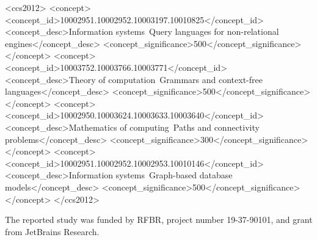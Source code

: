 \documentclass[sigconf,edbt,table]{acmart-edbt2021}
\begin{document}
%
\begin{CCSXML}
		<ccs2012>
		<concept>
			<concept_id>10002951.10002952.10003197.10010825</concept_id>
			<concept_desc>Information systems~Query languages for non-relational engines</concept_desc>
			<concept_significance>500</concept_significance>
		</concept>
		<concept>
			<concept_id>10003752.10003766.10003771</concept_id>
			<concept_desc>Theory of computation~Grammars and context-free languages</concept_desc>
			<concept_significance>500</concept_significance>
		</concept>
		<concept>
			<concept_id>10002950.10003624.10003633.10003640</concept_id>
			<concept_desc>Mathematics of computing~Paths and connectivity problems</concept_desc>
			<concept_significance>300</concept_significance>
		</concept>
		<concept>
			<concept_id>10002951.10002952.10002953.10010146</concept_id>
			<concept_desc>Information systems~Graph-based database models</concept_desc>
			<concept_significance>500</concept_significance>
		</concept>
		</ccs2012>
\end{CCSXML}





\maketitle







\begin{acks}
	The reported study was funded by RFBR, project number 19-37-90101, and grant from JetBrains Research.
\end{acks}
\end{document}
